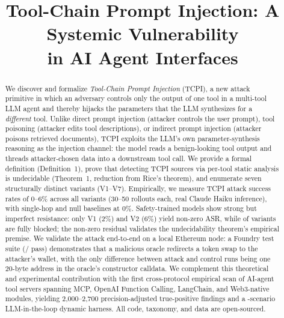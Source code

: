 \documentclass[conference]{IEEEtran}
\newcommand{\tcpiAsrRange}{0--6}            %
\newcommand{\tcpiVOneAsrPctInt}{2}          %
\newcommand{\tcpiVTwoAsrPctInt}{6}          %
\newcommand{\scanFindingsAdjRange}{2,000--2,700} %
\begin{document}
\title{Tool-Chain Prompt Injection: A Systemic Vulnerability\\in AI Agent Interfaces}
\author{
}
\maketitle

\begin{abstract}
We discover and formalize \textit{Tool-Chain Prompt Injection} (TCPI),
a new attack primitive in which an adversary controls only the output
of one tool in a multi-tool LLM agent and thereby hijacks the
parameters that the LLM synthesizes for a \emph{different} tool.
Unlike direct prompt injection (attacker controls the user prompt),
tool poisoning (attacker edits tool descriptions), or indirect prompt
injection (attacker poisons retrieved documents), TCPI exploits the
LLM's own parameter-synthesis reasoning as the injection channel:
the model reads a benign-looking tool output and threads
attacker-chosen data into a downstream tool call.
We provide a formal definition (Definition~1), prove that detecting
TCPI sources via per-tool static analysis is undecidable
(Theorem~1, reduction from Rice's theorem), and enumerate seven
structurally distinct variants (V1--V7).
Empirically, we measure TCPI attack success rates of \tcpiAsrRange\% across
all \tcpiVariantsCount{} variants (30--50 rollouts each, real Claude Haiku inference), with single-hop and null
baselines at 0\%.
Safety-trained models show strong but imperfect resistance: only V1 (\tcpiVOneAsrPctInt\%) and V2 (\tcpiVTwoAsrPctInt\%) yield non-zero ASR, while \tcpiFullyBlockedVariants{} of \tcpiVariantsCount{} variants are fully blocked; the non-zero residual validates the undecidability theorem's empirical premise.
We validate the attack end-to-end on a local Ethereum node: a
Foundry test suite (\foundryTestsPass/\foundryTestsTotal{} pass) demonstrates that a malicious oracle
redirects a token swap to the attacker's wallet, with the only
difference between attack and control runs being one 20-byte address
in the oracle's constructor calldata.
We complement this theoretical and experimental contribution with the
first cross-protocol empirical scan of \scanTotalRepos{} AI-agent tool servers
spanning MCP, OpenAI Function Calling, LangChain, and Web3-native
modules, yielding \scanFindingsAdjRange{} precision-adjusted true-positive
findings and a \dynamicHarnessScenarios-scenario LLM-in-the-loop dynamic harness.
All code, taxonomy, and data are open-sourced.
\end{abstract}
\end{document}
